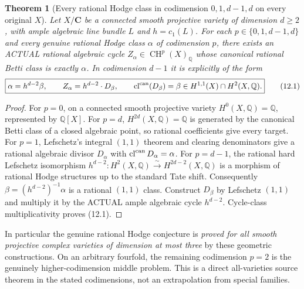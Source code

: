 \documentclass[11pt]{article}
\newcommand{\Q}{\mathbb Q}
\newcommand{\CH}{\operatorname{CH}}
\newcommand{\cl}{\operatorname{cl}}
\newtheorem{theorem}{Theorem}[section]
\begin{document}
\begin{theorem}[Every rational Hodge class in codimension \(0,1,d-1,d\) on every original \(X\)]
Let \(X/\mathbf C\) be a connected smooth projective
variety of dimension \(d\ge2\), with ample algebraic
line bundle \(L\) and \(h=c_1(L)\).
For each
\(p\in\{0,1,d-1,d\}\) and every genuine rational
Hodge class \(\alpha\) of codimension \(p\),
there exists an ACTUAL rational algebraic cycle
\(Z_\alpha\in\CH^p(X)_\Q\) whose canonical
rational Betti class is exactly \(\alpha\).
In codimension \(d-1\) it is explicitly of the form
\[
 \boxed{
 \alpha=h^{d-2}\beta,\qquad
 Z_\alpha=h^{d-2}\cdot D_\beta,\qquad
 \cl^{\rm can}(D_\beta)=\beta\in H^{1,1}(X)\cap H^2(X,\Q).
 }                                                       \tag{12.1}
\]
\end{theorem}
\begin{proof}
For \(p=0\), on a connected smooth projective
variety \(H^0(X,\Q)=\Q\), represented by
\(\Q[X]\). For \(p=d\), \(H^{2d}(X,\Q)=\Q\)
is generated by the canonical Betti class of a
closed algebraic point, so rational coefficients
give every target.
For \(p=1\), Lefschetz's integral \((1,1)\)
theorem and clearing denominators give a
rational algebraic divisor \(D_\alpha\)
with \(\cl^{\rm can}D_\alpha=\alpha\).
For \(p=d-1\), the rational hard Lefschetz
isomorphism
\(
 h^{d-2}:H^2(X,\Q)\xrightarrow{\sim}
 H^{2d-2}(X,\Q)
\)
is a morphism of rational Hodge structures
up to the standard Tate shift.
Consequently
\(\beta=(h^{d-2})^{-1}\alpha\) is a
rational \((1,1)\) class. Construct
\(D_\beta\) by Lefschetz \((1,1)\)
and multiply it by the ACTUAL ample
algebraic cycle \(h^{d-2}\).
Cycle-class multiplicativity proves (12.1).
\end{proof}

In particular the genuine rational Hodge conjecture
is \emph{proved for all smooth projective complex
varieties of dimension at most three} by these
geometric constructions. On an arbitrary fourfold,
the remaining codimension \(p=2\) is the
genuinely higher-codimension middle problem.
This is a direct all-varieties source theorem in
the stated codimensions, not an extrapolation
from special families.
\end{document}
